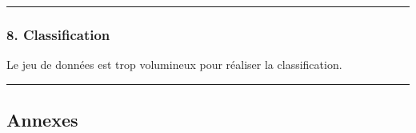 \documentclass[]{article}
\begin{document}
\begin{center}\rule{0.5\linewidth}{\linethickness}\end{center}

\subsubsection{8. Classification}\label{classification}

Le jeu de données est trop volumineux pour réaliser la classification.

\begin{center}\rule{0.5\linewidth}{\linethickness}\end{center}

\subsection{Annexes}\label{annexes}
\end{document}
